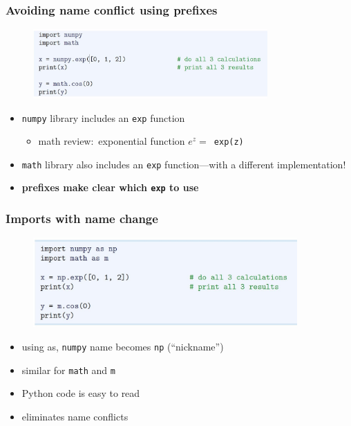 \documentclass[14pt]{beamer}
\newcommand\red[1]{{\color{red} #1}}
\newcommand\green[1]{{\color{green} #1}}
\newcommand{\cmark}{\ding{51}}%
\begin{document}

\begin{frame}[fragile]

\frametitle{Avoiding name conflict using prefixes}

\begin{figure}[ht]
	\centering
	\includegraphics[width=0.8\textwidth]{figures/LLp17}
\end{figure}
\begin{itemize}
	\item \texttt{numpy} library includes an \texttt{exp} function
	\begin{itemize}
		\item math review:~exponential function $e^{z} =$~\texttt{exp(z)}
	\end{itemize}
	\item \texttt{math} library also includes an \texttt{exp} function---with a different implementation!
	\item[\green{\cmark}] \textbf{prefixes make clear which \texttt{exp} to use}
\end{itemize}

\end{frame}


\begin{frame}[fragile]

\frametitle{Imports with name change}

\begin{figure}[ht]
	\centering
	\includegraphics[width=0.9\textwidth]{figures/LLp18}
\end{figure}
\vspace*{-8mm}
\begin{itemize}
	\item using \red{as}, \texttt{numpy} name becomes \texttt{np} (``nickname'')
	\item similar for \texttt{math} and \texttt{m}
	\item[\green{\cmark}] Python code is easy to read
	\item[\green{\cmark}\green{\cmark}] eliminates name conflicts
\end{itemize}

\end{frame}
\end{document}
